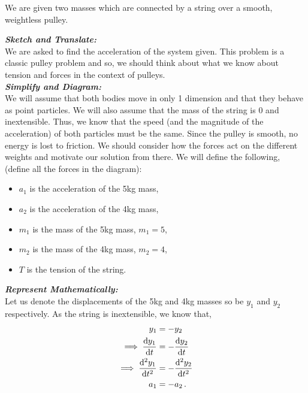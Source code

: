 \begin{subquestions}
\begin{subsubquestions}
\end{subsubquestions}	
	
	
\subquestion
We are given two masses which are connected by a string over a smooth, weightless pulley.

\begin{subsubquestions}
	
	\subsubquestion
	
	\textbf{\textit{Sketch and Translate:}} \\
	We are asked to find the acceleration of the system given. This problem is a classic pulley problem and so, we should think about what we know about tension and forces in the context of pulleys.\\
	
	
	
	
	\textbf{\textit{Simplify and Diagram:}} \\
	We will assume that both bodies move in only 1 dimension and that they behave as point particles. We will also assume that the mass of the string is 0 and inextensible. Thus, we know that the speed (and the magnitude of the acceleration) of both particles must be the same. Since the pulley is smooth, no energy is lost to friction. We should consider how the forces act on the different weights and motivate our solution from there.
	We will define the following, (define all the forces in the diagram):
	\begin{itemize}
		\item $a_1$ is the acceleration of the 5kg mass,
		\item $a_2$ is the acceleration of the 4kg mass,
		\item $m_1$ is the mass of the 5kg mass, $m_1=5$,
		\item $m_2$ is the mass of the 4kg mass, $m_2=4$,
		\item $T$ is the tension of the string.
	\end{itemize}
	
	
	
	\textbf{\textit{Represent Mathematically:}} \\ 
	Let us denote the displacements of the 5kg and 4kg masses so be $y_1$ and $y_2$ respectively. As the string is inextensible, we know that,
	\begin{align}
		y_1 & = -y_2 \nonumber \\
		\implies \frac{\mathrm{d}y_1}{\mathrm{d}t} & = -\frac{\mathrm{d}y_2}{\mathrm{d}t} \nonumber \\
		\implies \frac{\mathrm{d}^2y_1}{\mathrm{d}t^2} & = -\frac{\mathrm{d}^2y_2}{\mathrm{d}t^2} \nonumber \\
		a_1 & = -a_2 \,.
	\end{align}
	

\end{subsubquestions}
\end{subquestions}
